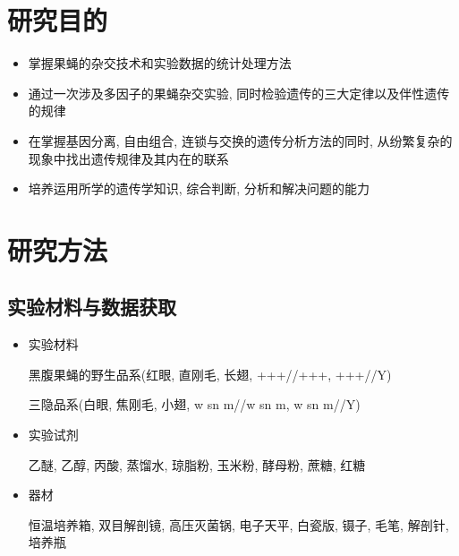 \documentclass[AutoFakeBold]{LZUThesis}
\begin{document}
\section{研究目的}
\begin{itemize}
    \item 掌握果蝇的杂交技术和实验数据的统计处理方法
    \item 通过一次涉及多因子的果蝇杂交实验, 同时检验遗传的三大定律以及伴性遗传的规律
    \item 在掌握基因分离, 自由组合, 连锁与交换的遗传分析方法的同时, 从纷繁复杂的现象中找出遗传规律及其内在的联系
    \item 培养运用所学的遗传学知识, 综合判断, 分析和解决问题的能力
\end{itemize}

\section{研究方法}
\subsection{实验材料与数据获取}
\begin{itemize}
    \item 实验材料\par
黑腹果蝇的野生品系(红眼, 直刚毛, 长翅, +++//+++, +++//Y)\par
三隐品系(白眼, 焦刚毛, 小翅, w sn m//w sn m, w sn m//Y)
    \item 实验试剂\par
乙醚, 乙醇, 丙酸, 蒸馏水, 琼脂粉, 玉米粉, 酵母粉, 蔗糖, 红糖
    \item 器材\par
恒温培养箱, 双目解剖镜, 高压灭菌锅, 电子天平, 白瓷版, 镊子, 毛笔, 解剖针, 培养瓶
\end{itemize}
\end{document}
